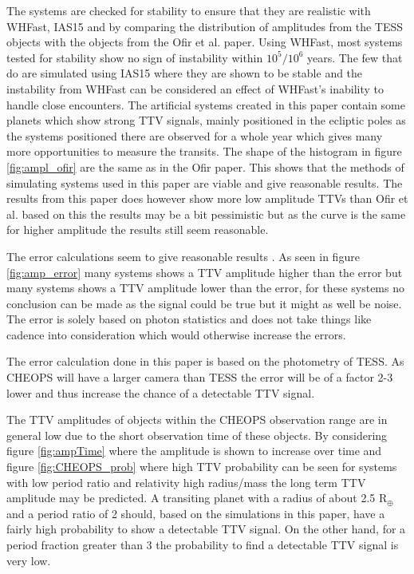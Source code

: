 \documentclass[12pt]{report}
\begin{document}
	The systems are checked for stability to ensure that they are realistic with WHFast, IAS15 and by comparing the distribution of amplitudes from the TESS objects with the objects from the Ofir et al. paper. Using WHFast, most systems tested for stability show no sign of instability within $10^5 / 10^6$ years. The few that do are simulated using IAS15 where they are shown to be stable and the instability from WHFast can be considered an effect of WHFast's inability to handle close encounters. The artificial systems created in this paper contain some planets which show strong TTV signals, mainly positioned in the ecliptic poles as the systems positioned there are observed for a whole year which gives many more opportunities to measure the transits. The shape of the histogram in figure \ref{fig:ampl_ofir} are the same as in the Ofir paper. This shows that the methods of simulating systems used in this paper are viable and give reasonable results. The results from this paper does however show more low amplitude TTVs than Ofir et al. based on this the results may be a bit pessimistic but as the curve is the same for higher amplitude the results still seem reasonable.
	
	The error calculations seem to give reasonable results \citep{2015ApJ...812L..18B}. As seen in figure \ref{fig:amp_error} many systems shows a TTV amplitude higher than the error but many systems shows a TTV amplitude lower than the error, for these systems no conclusion can be made as the signal could be true but it might as well be noise. The error is solely based on photon statistics and does not take things like cadence into consideration which would otherwise increase the errors. 
	
	The error calculation done in this paper is based on the photometry of TESS. As CHEOPS will have a larger camera than TESS the error will be of a factor 2-3 lower and thus increase the chance of a detectable TTV signal.
	
	The TTV amplitudes of objects within the CHEOPS observation range are in general low due to the short observation time of these objects. By considering figure \ref{fig:ampTime} where the amplitude is shown to increase over time and figure \ref{fig:CHEOPS_prob} where high TTV probability can be seen for systems with low period ratio and relativity high radius/mass the long term TTV amplitude may be predicted. A transiting planet with a radius of about 2.5 R$_{\oplus}$ and a period ratio of 2 should, based on the simulations in this paper, have a fairly high probability to show a detectable TTV signal. On the other hand, for a period fraction greater than 3 the probability to find a detectable TTV signal is very low.
\end{document}
